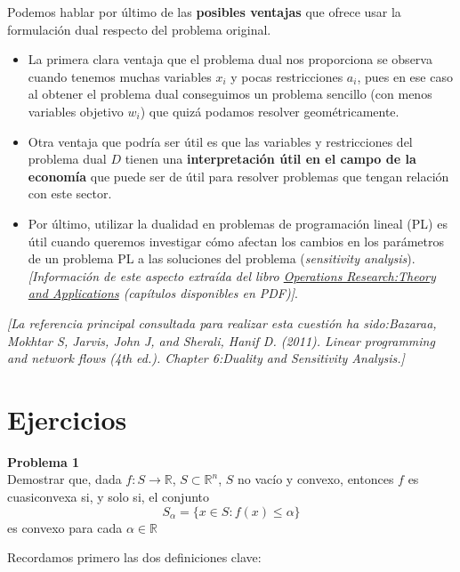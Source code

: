 \documentclass[a4paper]{article}
\newenvironment{problem}[2][Problema]
    { \begin{mdframed}[backgroundcolor=gray!20] \textbf{#1 #2} \\}
    {  \end{mdframed}}
\newcommand{\R}{\mathbb R}
\begin{document}
Podemos hablar por último de las \textbf{posibles ventajas} que ofrece usar la formulación dual respecto del problema original.

\begin{itemize}

\item La primera clara ventaja que el problema dual nos proporciona se observa cuando tenemos muchas variables \(x_i\) y pocas restricciones \(a_i\), pues en ese caso al obtener el problema dual conseguimos un problema sencillo (con menos variables objetivo \(w_i\)) que quizá podamos resolver geométricamente.

\item Otra ventaja que podría ser útil es que las variables y restricciones del problema dual \(D\) tienen una \textbf{interpretación útil en el campo de la economía} que puede ser de útil para resolver problemas que tengan relación con este sector.

\item Por último, utilizar la dualidad en problemas de programación lineal (PL) es útil cuando queremos investigar cómo afectan los cambios en los parámetros de un problema PL a las soluciones del problema (\emph{sensitivity analysis}).\\
\emph{[Información de este aspecto extraída del libro \href{https://books.google.es/books?id=1EZxJHO32swC}{Operations Research:Theory and Applications} (capítulos disponibles en PDF)]}.
\end{itemize}

\emph{[La referencia principal consultada para realizar esta cuestión ha sido:Bazaraa, Mokhtar S, Jarvis, John J, and Sherali, Hanif D. (2011). Linear programming and
network flows (4th ed.). Chapter 6:Duality and Sensitivity Analysis.]}


\newpage

\section{Ejercicios}

\begin{problem}{1}
Demostrar que, dada \(f:S\to \R\), \(S\subset \R^n\), \(S\) no vacío y convexo, entonces \(f\) es cuasiconvexa si, y solo si, el conjunto
\[
S_\alpha = \{x \in S: f(x) \leq \alpha\}
\]
es convexo para cada \(\alpha \in \R\)
\end{problem}

Recordamos primero las dos definiciones clave:
\end{document}
